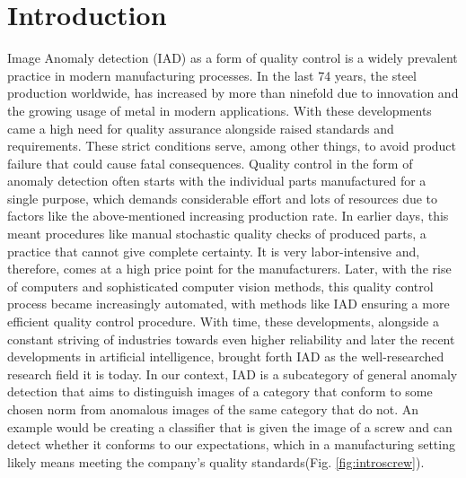 \chapter{Introduction}
\label{chap:introduction}

Image Anomaly detection (IAD) as a form of quality control is a widely prevalent practice in modern manufacturing processes. In the last 74 years, the steel production worldwide, 
has increased by more than ninefold \cite{worldsteel} due to innovation and the growing usage of metal in modern applications. 
With these developments came a high need for quality 
assurance alongside raised standards and requirements. These strict conditions serve, among other things, to avoid product failure that could cause fatal consequences. Quality control in the form of anomaly detection often 
starts with the individual parts manufactured for a single purpose, which demands considerable effort and lots of resources due to factors like 
the above-mentioned increasing production rate. 
In earlier days, this meant procedures like manual stochastic quality checks of produced parts, a practice that cannot give 
complete certainty. It is very labor-intensive and, therefore, comes at a high price point for the manufacturers. Later, with the rise of computers and sophisticated computer vision methods, 
this quality control process became increasingly automated, with methods like IAD ensuring a more efficient quality control procedure. With time, these developments, 
alongside a constant striving of industries towards even higher reliability and later the recent developments in artificial intelligence, brought forth IAD as the 
well-researched research field it is today.\newline 
In our context, IAD is a subcategory of general anomaly detection 
that aims to distinguish images of a category that conform to some chosen norm from anomalous images of the same category that do not. 
An example would be creating a classifier that is given the image of a screw and can detect whether it conforms to our expectations, 
which in a manufacturing setting likely means meeting the company's quality standards(Fig. \ref{fig:introscrew}).



